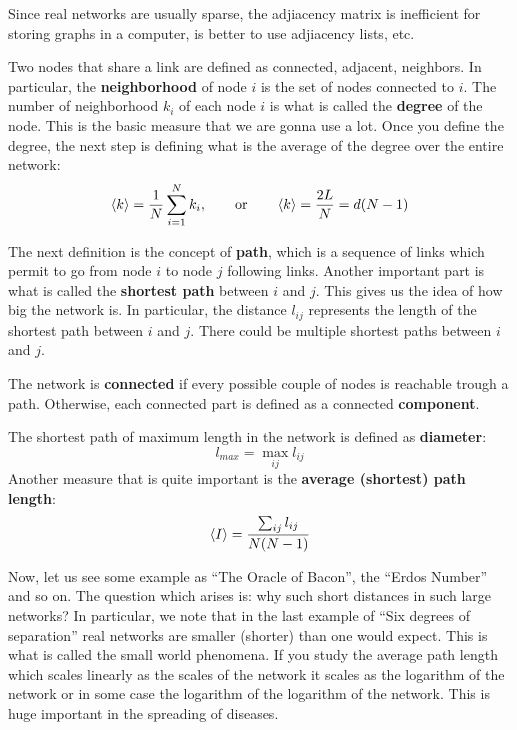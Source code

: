 \documentclass[../main/main.tex]{subfiles}
\begin{document}
Since real networks are usually sparse, the adjiacency matrix is inefficient for storing graphs in a computer, is better to use adjiacency lists, etc.

Two nodes that share a link are defined as connected, adjacent, neighbors. In particular, the \textbf{neighborhood} of node \( i \) is the set of nodes connected to \( i \).
The number of neighborhood \( k_i \) of each node \( i \) is what is called the \textbf{degree} of the node. This is the basic measure that we are gonna use a lot. Once you define the degree, the next step is defining what is the average of the degree over the entire network:
\begin{equation}
  \expval{k} = \frac{1}{N} \sum_{i=1}^{N} k_i, \qquad \text{or} \qquad \expval{k} = \frac{2L}{N} = d(N-1)
\end{equation}

The next definition is the concept of \textbf{path}, which is a sequence of links which permit to go from node \( i \) to node \( j \) following links.
Another important part is what is called the \textbf{shortest path} between \( i  \) and \( j \). This gives us the idea of how big the network is. In particular, the distance \( l_{ij} \) represents the length of the shortest path between \( i \) and \( j \). There could be multiple shortest paths between \( i \) and \( j \).

The network is \textbf{connected} if every possible couple of nodes is reachable trough a path. Otherwise, each connected part is defined as a connected \textbf{component}.


The shortest path of maximum length in the network is defined as \textbf{diameter}:
\begin{equation*}
  l_{max} = \max_{ij} l_{ij}
\end{equation*}
Another measure that is quite important is the \textbf{average (shortest) path length}:
\begin{equation*}
  \expval{I} = \frac{\sum_{ij}^{} l_{ij} }{N(N-1)}
\end{equation*}

Now, let us see some example as “The Oracle of Bacon”, the “Erdos Number” and so on.
The question which arises is: why such short distances in such large networks?
In particular, we note that in the last example of “Six degrees of separation” real networks are smaller (shorter) than one would expect.
This is what is called the small world phenomena. If you study the average path length which scales linearly as the scales of the network it scales as the logarithm of the network or in some case the logarithm of the logarithm of the network. This is huge important in the spreading of diseases.
\end{document}
